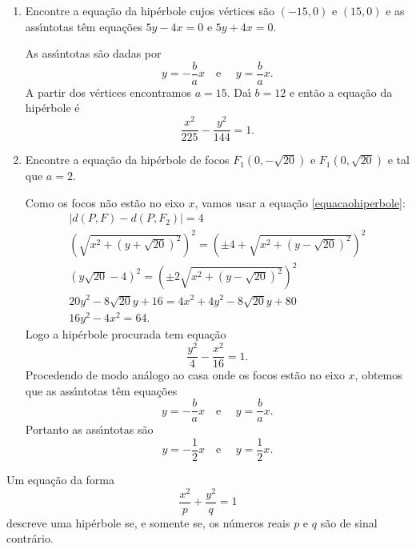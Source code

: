 \begin{exemplos}
  \begin{enumerate}
    \item Encontre a equa\c{c}\~ao da hip\'erbole cujos v\'ertices s\~ao $(-15,0)$ e $(15,0)$ e as ass{\'\i}ntotas t\^em equa\c{c}\~oes $5y - 4x = 0$ e $5y + 4x = 0$.
    \begin{solucao}
      As ass{\'\i}ntotas s\~ao dadas por
      \[
        y = -\dfrac{b}{a}x \quad\mbox{e }\quad y = \dfrac{b}{a}x.
      \]
      A partir dos v\'ertices encontramos $a = 15$. Da{\'\i} $b = 12$ e ent\~ao a equa\c{c}\~ao da hip\'erbole \'e
      \[
        \dfrac{x^2}{225} - \dfrac{y^2}{144} = 1.
      \]
    \end{solucao}
    \item Encontre a equa\c{c}\~ao da hip\'erbole de focos $F_1(0,-\sqrt{20})$ e $F_1(0,\sqrt{20})$ e tal que $a = 2$.
    \begin{solucao}
      Como os focos n\~ao est\~ao no eixo $x$, vamos usar a equa\c{c}\~ao \eqref{equacaohiperbole}:
      \begin{align*}
        \mid d(P,F) - d(P,F_2)\mid = 4\\
        (\sqrt{x^2 + (y + \sqrt{20})^2})^2 = (\pm 4 + \sqrt{x^2 + (y - \sqrt{20})^2})^2\\
        (y\sqrt{20} - 4)^2 = (\pm 2\sqrt{x^2 + (y - \sqrt{20})^2})^2\\
        20y^2 - 8\sqrt{20}y + 16 = 4x^2 + 4y^2 - 8\sqrt{20}y + 80\\
        16y^2 - 4x^2 = 64.
      \end{align*}
      Logo a hip\'erbole procurada tem equa\c{c}\~ao
      \[
        \dfrac{y^2}{4} - \dfrac{x^2}{16} = 1.
      \]
      Procedendo de modo an\'alogo ao casa onde os focos est\~ao no eixo $x$, obtemos que as ass{\'\i}ntotas t\^em equa\c{c}\~oes
      \[
        y = -\dfrac{b}{a}x \quad\mbox{e }\quad y = \dfrac{b}{a}x.
      \]
      Portanto as ass{\'\i}ntotas s\~ao
      \[
        y = -\dfrac{1}{2}x \quad\mbox{e }\quad y = \dfrac{1}{2}x.
      \]
    \end{solucao}
  \end{enumerate}
\end{exemplos}

\begin{proposicao}
  Um equa\c{c}\~ao da forma
  \begin{equation}\label{hiperbolegeral}
    \dfrac{x^2}{p} + \dfrac{y^2}{q} = 1
  \end{equation}
  descreve uma hip\'erbole se, e somente se, os n\'umeros reais $p$ e $q$ s\~ao de sinal contr\'ario.
\end{proposicao}


